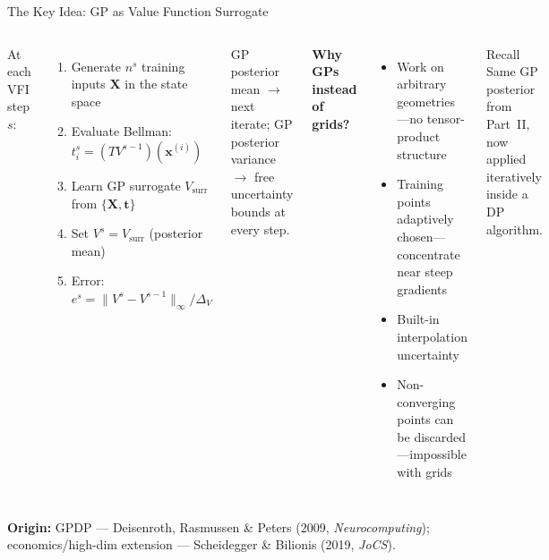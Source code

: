\documentclass[aspectratio=169,11pt]{beamer}
\newcommand{\emphc}[1]{\textcolor{harvardcrimson}{#1}}
\newcommand{\x}{\bm{x}}
\newcommand{\X}{\bm{X}}
\begin{document}
\begin{frame}{The Key Idea: GP as Value Function Surrogate}
\scriptsize
\begin{columns}[T]
At each VFI step $s$:

\vspace{0.2em}
\begin{enumerate}\itemsep1pt
    \item Generate $n^s$ training inputs $\X$ in the state space
    \item Evaluate Bellman: $t_i^s = (TV^{s-1})(\x^{(i)})$
    \item Learn GP surrogate $V_{\text{surr}}$ from $\{\X, \bm{t}\}$
    \item Set $V^s = V_{\text{surr}}$ (posterior mean)
    \item Error: $e^s = \|V^s - V^{s-1}\|_\infty/\Delta_V$
\end{enumerate}

\vspace{0.2em}
GP posterior mean $\to$ next iterate; GP posterior \emphc{variance} $\to$ free uncertainty bounds at every step.

\textbf{Why GPs instead of grids?}

\vspace{0.2em}
\begin{itemize}\itemsep1pt
    \item Work on \emphc{arbitrary geometries}---no tensor-product structure
    \item Training points \emphc{adaptively chosen}---concentrate near steep gradients
    \item Built-in \emphc{interpolation uncertainty}
    \item Non-converging points can be \emphc{discarded}---impossible with grids
\end{itemize}

\vspace{0.2em}
\begin{block}{Recall}
\tiny
Same GP posterior from Part~II, now applied iteratively inside a DP algorithm.
\end{block}
\end{columns}

\vspace{0.1em}
{\tiny \textbf{Origin:} GPDP — Deisenroth, Rasmussen \& Peters (2009, \emph{Neurocomputing}); economics/high-dim extension — Scheidegger \& Bilionis (2019, \emph{JoCS}).}
\end{frame}
\end{document}
